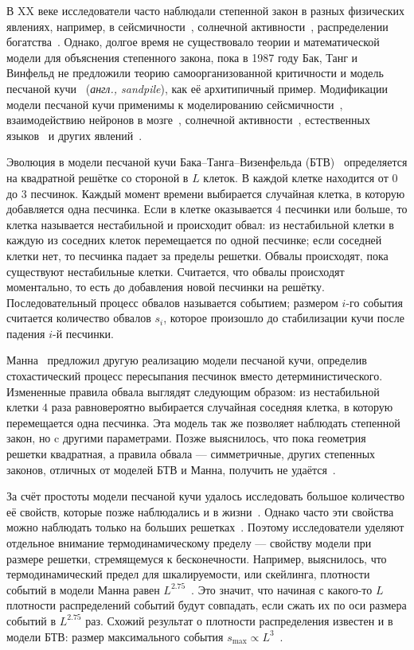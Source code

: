 В XX веке исследователи часто наблюдали степенной закон в разных физических явлениях, например, в сейсмичности~\cite{Burridge1967ModelAT}, солнечной активности~\cite{Dennis1985SolarHX}, распределении богатства~\cite{Levy1997NEWEF}. Однако, долгое время не существовало теории и математической модели для объяснения степенного закона, пока в 1987 году Бак, Танг и Винфельд не предложили теорию самоорганизованной критичности и модель песчаной кучи~\cite{btw} (\textit{англ., sandpile}), как её архитипичный пример. Модификации модели песчаной кучи применимы к моделированию сейсмичности~\cite{Khodaverdian2016,TURCOTTE1999275}, взаимодействию нейронов в мозге~\cite{Bak1996HowNW}, солнечной активности~\cite{Aschwanden2021SelforganizedCI}, естественных языков~\cite{Gromov2020} и других явлений~\cite{bunde,Kalinin2021,podgornik}.

Эволюция в модели песчаной кучи Бака–Танга–Визенфельда (БТВ)~\cite{btw} определяется на квадратной решётке со стороной в $L$ клеток. В каждой клетке находится от $0$ до $3$ песчинок. Каждый момент времени выбирается случайная клетка, в которую добавляется одна песчинка. Если в клетке оказывается $4$ песчинки или больше, то клетка называется нестабильной и происходит обвал: из нестабильной клетки в каждую из соседних клеток перемещается по одной песчинке; если соседней клетки нет, то песчинка падает за пределы решетки. Обвалы происходят, пока существуют нестабильные клетки. Считается, что обвалы происходят моментально, то есть до добавления новой песчинки на решётку. Последовательный процесс обвалов называется событием; размером $i$-го события считается количество обвалов $s_i$, которое произошло до стабилизации кучи после падения $i$-й песчинки.

Манна~\cite{manna} предложил другую реализацию модели песчаной кучи, определив стохастический процесс пересыпания песчинок вместо детерминистического. Измененные правила обвала выглядят следующим образом: из нестабильной клетки $4$ раза равновероятно выбирается случайная соседняя клетка, в которую перемещается одна песчинка. Эта модель так же позволяет наблюдать степенной закон, но c другими параметрами. Позже выяснилось, что пока геометрия решетки квадратная, а правила обвала --- симметричные, других степенных законов, отличных от моделей БТВ и Манна, получить не удаётся~\cite{BenHur1996,Dhar2006}.

За счёт простоты модели песчаной кучи удалось исследовать большое количество её свойств, которые позже наблюдались и в жизни~\cite{Held1990,Jaeger1989}. Однако часто эти свойства можно наблюдать только на больших решетках~\cite{Liu1991}. Поэтому исследователи уделяют отдельное внимание термодинамическому пределу --- свойству модели при размере решетки, стремящемуся к бесконечности. Например, выяснилось, что термодинамический предел для шкалируемости, или скейлинга, плотности событий в модели Манна равен $L^{2.75}$~\cite{manna,Vespignani2000AbsorbingstatePT,Dhar2006}. Это значит, что начиная с какого-то $L$ плотности распределений событий будут совпадать, если сжать их по оси размера событий в $L^{2.75}$ раз. Схожий результат о плотности распределения известен и в модели БТВ: размер максимального события $s_{\max} \propto L^3$~\cite{Garber2009}.

